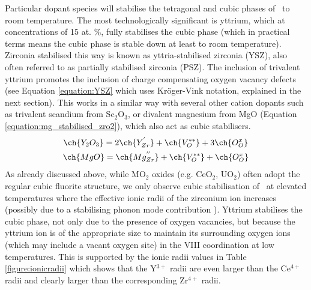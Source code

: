 Particular dopant species will stabilise the tetragonal and cubic phases of \zirconia\ to room temperature. The most technologically significant is yttrium, which at concentrations of 15 at. \%, fully stabilises the cubic phase (which in practical terms means the cubic phase is stable down at least to room temperature). Zirconia stabilised this way is known as yttria-stabilised zirconia (YSZ), also often referred to as partially stabilised zirconia (PSZ). The inclusion of trivalent yttrium promotes the inclusion of charge compensating oxygen vacancy defects (see Equation \ref{equation:YSZ} which uses Kr\"{o}ger-Vink notation, explained in the next section). This works in a similar way with several other cation dopants such as trivalent scandium from Sc$_{2}$O$_{3}$, or divalent magnesium from MgO (Equation \ref{equation:mg_stabilised_zro2}), which also act as cubic stabilisers.
\begin{gather}
\ch{Y_{2}O_{3}} = 2\ch{Y_{Zr}^{'}} + \ch{V_{O}^{**}} + 3\ch{O_{O}^{x}} \label{equation:YSZ} \\
\ch{MgO} = \ch{Mg_{Zr}^{''}} + \ch{V_{O}^{**}} + \ch{O_{O}^{x}} 
\label{equation:mg_stabilised_zro2}
\end{gather}
As already discussed above, while MO$_{2}$ oxides (e.g. CeO$_{2}$, UO$_{2}$) often adopt the regular cubic fluorite structure, we only observe cubic stabilisation  of \zirconia\ at elevated temperatures where the effective ionic radii of the zirconium ion increases (possibly due to a stabilising phonon mode contribution \cite{Mirgorodsky1999, Perry1990, Simeone2003, Harlow2018}). Yttrium stabilises the cubic phase, not only due to the presence of oxygen vacancies, but because the yttrium ion is of the appropriate size to maintain its surrounding oxygen ions (which may include a vacant oxygen site) in the VIII coordination at low temperatures. This is supported by the ionic radii values in Table \ref{figure:ionicradii} which shows that the Y$^{3+}$ radii are even larger than the Ce$^{4+}$ radii and clearly larger than the corresponding Zr$^{4+}$ radii. 


